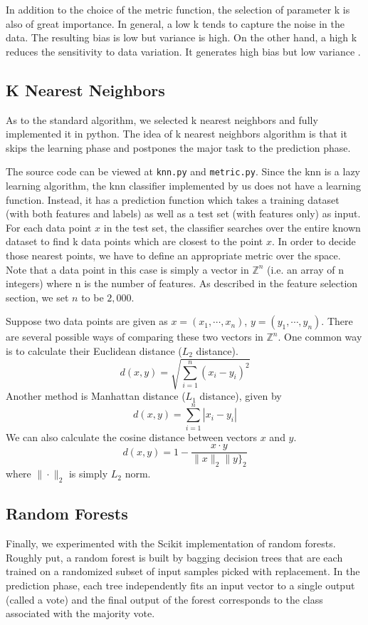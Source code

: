 \documentclass{acm_proc_article-sp}
\begin{document}
In addition to the choice of the metric function, the selection of parameter k is also of great importance. In general, a low k tends to capture the noise in the data. The resulting bias is low but variance is high. On the other hand, a high k reduces the sensitivity to data variation. It generates high bias but low variance \cite{pineaul9}. 


\subsection{K Nearest Neighbors}
As to the standard algorithm, we selected k nearest neighbors and fully implemented it in python. The idea of k nearest neighbors algorithm is that it skips the learning phase and postpones the major task to the prediction phase.

The source code can be viewed at \texttt{knn.py} and \texttt{metric.py}. Since the knn is a lazy learning algorithm, the knn classifier implemented by us does not have a learning function. Instead, it has a prediction function which takes a training dataset (with both features and labels) as well as a test set (with features only) as input. For each data point $x$ in the test set, the classifier searches over the entire known dataset to find k data points which are closest to the point $x$. In order to decide those nearest points, we have to define an appropriate metric over the space. Note that a data point in this case is simply a vector in $\mathbb{Z}^n$ (i.e. an array of n integers) where n is the number of features. As described in the feature selection section, we set $n$ to be $2,000$. 

Suppose two data points are given as $x=(x_1, \cdots, x_n)$, $y=(y_1, \cdots, y_n)$. There are several possible ways of comparing these two vectors in $\mathbb{Z}^n$. One common way is to calculate their Euclidean distance ($L_2$ distance).
\[d(x,y) = \sqrt{\sum_{i=1}^{n} (x_i - y_i)^2}\]
Another method is Manhattan distance ($L_1$ distance), given by 
\[d(x,y) = \sum_{i=1}^{n} | x_i - y_i |\]
We can also calculate the cosine distance between vectors $x$ and $y$. 
\[
d(x,y) = 1 - \frac{x \cdot y}{ \| x \|_2  \| y \}_2}
\]
where $\| \cdot \|_2$ is simply $L_2$ norm.

\subsection{Random Forests}
Finally, we experimented with the Scikit implementation of random forests. Roughly put, a random forest is built by bagging decision trees that are each trained on a randomized subset of input samples picked with replacement. In the prediction phase, each tree independently  fits an input vector to a single output (called a vote) and the final output of the forest corresponds to the class associated with the majority vote.
\end{document}
